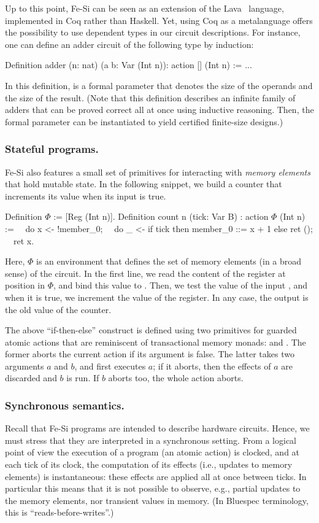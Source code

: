\documentclass{llncs}
\begin{document}
Up to this point, Fe-Si can be seen as an extension of the
Lava~\cite{Bjesse98lava:hardware} language, implemented in Coq rather
than Haskell. Yet, using Coq as a metalanguage offers the possibility
to use dependent types in our circuit descriptions. For instance, one
can define an adder circuit of the following type by induction:
\begin{mcoq}
Definition adder (n: nat) (a b: Var (Int n)): action [] (Int n) := ...
\end{mcoq}
In this definition,  is a formal parameter that denotes the
size of the operands and the size of the result. (Note that
this definition describes an infinite family of adders that can be
proved correct all at once using inductive reasoning. Then, the formal
parameter can be instantiated to yield certified finite-size designs.)

\subsubsection{Stateful programs.}
Fe-Si also features a small set of primitives for interacting with
\emph{memory elements} that hold mutable state. In the following
snippet, we build a counter that increments its value when its input
is true.
\begin{mcoq}
Definition $\Phi$ := [Reg (Int n)].
Definition count n (tick: Var B) : action $\Phi$ (Int n) :=
$\quad$do x <- !member_0;
$\quad$do _ <- if tick then {member_0 ::= x + 1} else {ret ()}; 
$\quad$ret x. 
\end{mcoq}
Here, $\Phi$ is an environment that defines the set of memory elements
(in a broad sense) of the circuit. In the first line, we read the
content of the register at position  in $\Phi$, and
bind this value to . Then, we test the value of the input
, and when it is true, we increment the value of the
register. In any case, the output is the old value of the counter.

The above ``if-then-else'' construct is defined using two primitives
for guarded atomic actions that are reminiscent of transactional
memory monads:  and . The former aborts the
current action if its argument is false.
%
The latter takes two arguments $a$ and $b$, and first executes $a$; if
it aborts, then the effects of $a$ are discarded and $b$ is run. If
$b$ aborts too, the whole action  aborts. 


\subsubsection{Synchronous semantics.} Recall that Fe-Si programs are
intended to describe hardware circuits. Hence, we must stress that
they are interpreted in a synchronous setting.
%
From a logical point of view the execution of a program (an atomic
action) is clocked, and at each tick of its clock, the computation of
its effects (i.e., updates to memory elements) is instantaneous: these
effects are applied all at once between ticks.
%
In particular this means that it is not possible to observe, e.g.,
partial updates to the memory elements, nor transient values in
memory.
%
(In Bluespec terminology, this is ``reads-before-writes''.)
\end{document}
